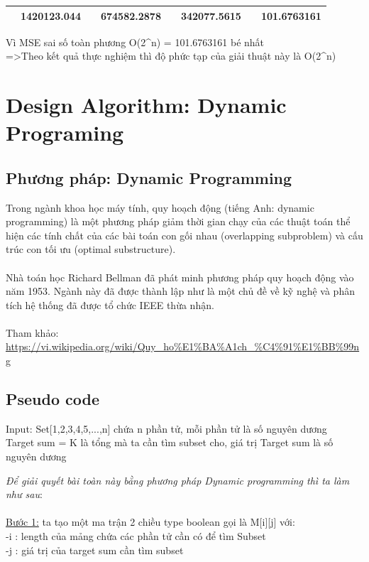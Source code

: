 \documentclass{article}
\begin{document}
\begin{flushleft}
\begin{adjustbox}{height=0.25\textwidth,width=1.1\textwidth,center=\textwidth}
\begin{tabular}{|c|c|c|c|c|c|c|c|}
        \hline
        {}&	1420123.044
&{}&674582.2878
&{}&342077.5615
&{}&	101.6763161
\\
        \hline
        \end{tabular}
        \end{adjustbox}
    \end{flushleft}
    
    Vì MSE sai số toàn phương O({2^n})  = 101.6763161 bé nhất\\
    =>Theo kết quả thực nghiệm thì độ phức tạp của giải thuật này là O({2^n})



\newpage
\section{\fontsize{20}{20}\selectfont Design Algorithm: Dynamic Programing}

    \fontsize{16}{16}\selectfont
    \subsection{ \fontsize{16}{16}\selectfont\textbf{Phương pháp: Dynamic Programming}}
    Trong ngành khoa học máy tính, quy hoạch động (tiếng Anh: dynamic programming) là một phương pháp giảm thời gian chạy của các thuật toán thể hiện các tính chất của các bài toán con gối nhau (overlapping subproblem) và cấu trúc con tối ưu (optimal substructure).\\\\
    Nhà toán học Richard Bellman đã phát minh phương pháp quy hoạch động vào năm 1953. Ngành này đã được thành lập như là một chủ đề về kỹ nghệ và phân tích hệ thống đã được tổ chức IEEE thừa nhận.\\\\
    Tham khảo: \url{https://vi.wikipedia.org/wiki/Quy_ho%E1%BA%A1ch_%C4%91%E1%BB%99ng}
    \subsection{ \fontsize{16}{16}\selectfont\textbf{Pseudo code}}
    Input: Set[1,2,3,4,5,...,n] chứa n phần tử, mỗi phần tử là số nguyên dương\\
    \hspace*{2cm}Target sum = K là tổng mà ta cần tìm subset cho, giá trị Target sum là số nguyên dương
    
    \textit{Để giải quyết bài toàn này bằng phương pháp Dynamic programming thì ta làm như sau}:\\\\
    \hspace*{0.5cm}\underline{Bước 1:} ta tạo một ma trận 2 chiều type boolean gọi là M[i][j] với:\\
    \hspace*{1.8cm}-i : length của mảng chứa các phần tử cần có để tìm Subset\\
    \hspace*{1.8cm}-j : giá trị của target sum cần tìm subset\\\\
    
\end{document}
